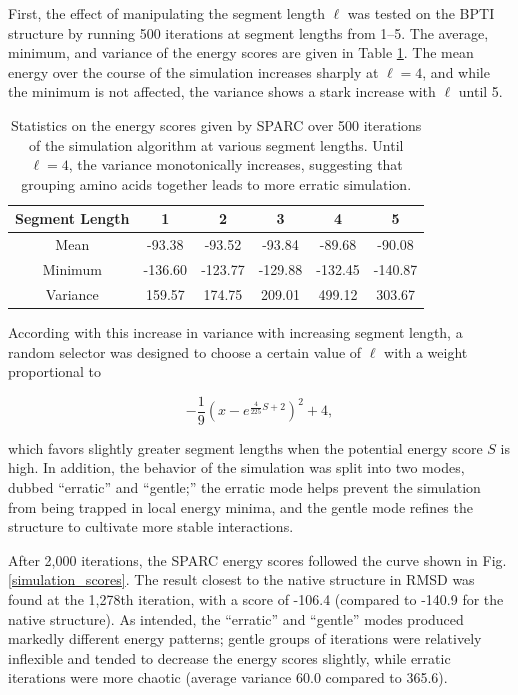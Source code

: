 \documentclass[11pt,titlepage]{article}
\begin{document}
First, the effect of manipulating the segment length $\ell$ was tested on the BPTI structure by running 500 iterations at segment lengths from 1--5.
The average, minimum, and variance of the energy scores are given in Table \ref{segment_length_table}.
The mean energy over the course of the simulation increases sharply at $\ell=4$, and while the minimum is not affected, the variance shows a stark increase with $\ell$ until 5.

\begin{table}
	\begin{center}
		\begin{tabular}{c c c c c c}
			\toprule
			Segment Length & 1 & 2 & 3 & 4 & 5 \\
			\midrule
			Mean     & -93.38  & -93.52  & -93.84  & -89.68  & -90.08  \\
			Minimum  & -136.60 & -123.77 & -129.88 & -132.45 & -140.87 \\
			Variance & 159.57  & 174.75  & 209.01  & 499.12  & 303.67 \\ 
			\bottomrule
		\end{tabular}
	\end{center}
	\caption{Statistics on the energy scores given by SPARC over 500 iterations of the simulation algorithm at various segment lengths. Until $\ell=4$, the variance monotonically increases, suggesting that grouping amino acids together leads to more erratic simulation.}
	\label{segment_length_table}
\end{table}

According with this increase in variance with increasing segment length, a random selector was designed to choose a certain value of $\ell$ with a weight proportional to

\begin{equation}
-\frac{1}{9}\left(x-e^{\frac{4}{225}S+2}\right)^2+4,
\end{equation}

which favors slightly greater segment lengths when the potential energy score $S$ is high.
In addition, the behavior of the simulation was split into two modes, dubbed ``erratic'' and ``gentle;'' the erratic mode helps prevent the simulation from being trapped in local energy minima, and the gentle mode refines the structure to cultivate more stable interactions.

After 2,000 iterations, the SPARC energy scores followed the curve shown in Fig. \ref{simulation_scores}. 
The result closest to the native structure in RMSD was found at the 1,278th iteration, with a score of -106.4 (compared to -140.9 for the native structure).
As intended, the ``erratic'' and ``gentle'' modes produced markedly different energy patterns; gentle groups of iterations were relatively inflexible and tended to decrease the energy scores slightly, while erratic iterations were more chaotic (average variance 60.0 compared to 365.6).
\end{document}
